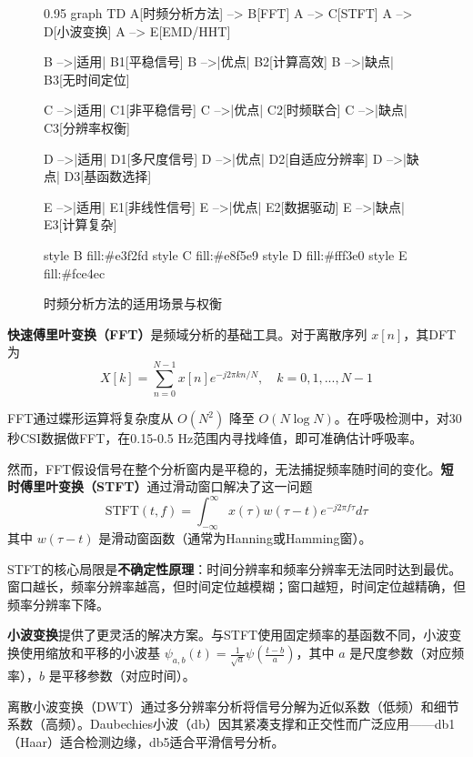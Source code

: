 \begin{figure}[htbp]
    \centering
    \begin{mmd}{0.95\textwidth}
graph TD
    A[时频分析方法] --> B[FFT]
    A --> C[STFT]
    A --> D[小波变换]
    A --> E[EMD/HHT]
    
    B -->|适用| B1[平稳信号]
    B -->|优点| B2[计算高效]
    B -->|缺点| B3[无时间定位]
    
    C -->|适用| C1[非平稳信号]
    C -->|优点| C2[时频联合]
    C -->|缺点| C3[分辨率权衡]
    
    D -->|适用| D1[多尺度信号]
    D -->|优点| D2[自适应分辨率]
    D -->|缺点| D3[基函数选择]
    
    E -->|适用| E1[非线性信号]
    E -->|优点| E2[数据驱动]
    E -->|缺点| E3[计算复杂]
    
    style B fill:#e3f2fd
    style C fill:#e8f5e9
    style D fill:#fff3e0
    style E fill:#fce4ec
    \end{mmd}
    \caption{时频分析方法的适用场景与权衡}
    \label{fig:time-frequency-methods}
\end{figure}

\textbf{快速傅里叶变换（FFT）}是频域分析的基础工具。对于离散序列 $x[n]$，其DFT为
\begin{equation}
    X[k] = \sum_{n=0}^{N-1} x[n] e^{-j2\pi kn/N}, \quad k = 0, 1, ..., N-1
\end{equation}

FFT通过蝶形运算将复杂度从 $O(N^2)$ 降至 $O(N\log N)$。在呼吸检测中，对30秒CSI数据做FFT，在0.15-0.5 Hz范围内寻找峰值，即可准确估计呼吸率。

然而，FFT假设信号在整个分析窗内是平稳的，无法捕捉频率随时间的变化。\textbf{短时傅里叶变换（STFT）}通过滑动窗口解决了这一问题
\begin{equation}
    \text{STFT}(t,f) = \int_{-\infty}^{\infty} x(\tau)w(\tau-t)e^{-j2\pi f\tau}d\tau
\end{equation}
其中 $w(\tau-t)$ 是滑动窗函数（通常为Hanning或Hamming窗）。

STFT的核心局限是\textbf{不确定性原理}：时间分辨率和频率分辨率无法同时达到最优。窗口越长，频率分辨率越高，但时间定位越模糊；窗口越短，时间定位越精确，但频率分辨率下降。

\textbf{小波变换}提供了更灵活的解决方案。与STFT使用固定频率的基函数不同，小波变换使用缩放和平移的小波基 $\psi_{a,b}(t) = \frac{1}{\sqrt{a}}\psi\left(\frac{t-b}{a}\right)$，其中 $a$ 是尺度参数（对应频率），$b$ 是平移参数（对应时间）。

离散小波变换（DWT）通过多分辨率分析将信号分解为近似系数（低频）和细节系数（高频）。Daubechies小波（db）因其紧凑支撑和正交性而广泛应用——db1（Haar）适合检测边缘，db5适合平滑信号分析。

